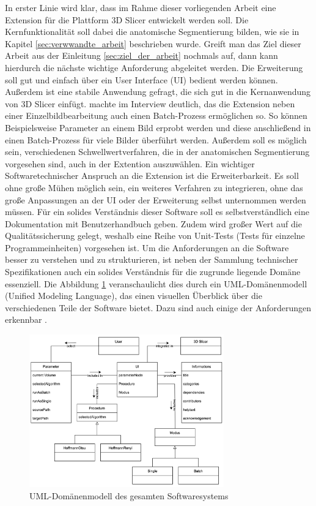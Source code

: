 In erster Linie wird klar, dass im Rahme dieser vorliegenden Arbeit eine
Extension für die Plattform 3D Slicer entwickelt werden soll. Die Kernfunktionalität
soll dabei die anatomische Segmentierung bilden, wie sie in Kapitel
\ref{sec:verwwandte_arbeit} beschrieben wurde. Greift man das Ziel dieser Arbeit
aus der Einleitung \ref{sec:ziel_der_arbeit} nochmals auf, dann kann hierdurch
die nächste wichtige Anforderung abgeleitet werden. Die Erweiterung soll gut und
einfach über ein User Interface (UI) bedient werden können. Außerdem ist eine
stabile Anwendung gefragt, die sich gut in die Kernanwendung von 3D Slicer einfügt.
\citet[]{walter2025} machte im Interview deutlich, das die Extension neben einer
Einzelbildbearbeitung auch einen Batch-Prozess ermöglichen so. So können Beispielsweise
Parameter an einem Bild erprobt werden und diese anschließend in einen Batch-Prozess
für viele Bilder überführt werden. Außerdem soll es möglich sein, verschiedenen Schwellwertverfahren,
die in der anatomischen Segmentierung vorgesehen sind, auch in der Extention auszuwählen.
Ein wichtiger Softwaretechnischer Anspruch an die Extension ist die
Erweiterbarkeit. Es soll ohne große Mühen möglich sein, ein weiteres Verfahren
zu integrieren, ohne das große Anpassungen an der UI oder der Erweiterung selbst
unternommen werden müssen. Für ein solides Verständnis dieser Software soll es
selbstverständlich eine Dokumentation mit Benutzerhandbuch geben. Zudem wird großer
Wert auf die Qualitätssicherung gelegt, weshalb eine Reihe von Unit-Tests (Tests
für einzelne Programmeinheiten) vorgesehen ist. Um die Anforderungen an die Software
besser zu verstehen und zu strukturieren, ist neben der Sammlung technischer
Spezifikationen auch ein solides Verständnis für die zugrunde liegende Domäne
essenziell. Die Abbildung \ref{fig:3d_slicer_domäne} veranschaulicht dies durch ein
UML-Domänenmodell (Unified Modeling Language), das einen visuellen Überblick
über die verschiedenen Teile der Software bietet. Dazu sind auch einige der Anforderungen
erkennbar \citep[vgl.][]{walter2025}.

\begin{figure}[h]
	\centering
	\includegraphics[width=0.75\textwidth]{img/domaenenmodell.jpg}
	\caption{UML-Domänenmodell des gesamten Softwaresystems}
	\label{fig:3d_slicer_domäne}
\end{figure}

